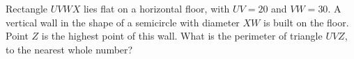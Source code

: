 Rectangle $UVWX$ lies flat on a horizontal floor, with $UV=20$ and $VW=30$. A vertical wall in the shape of a semicircle with diameter $XW$ is built on the floor. Point $Z$ is the highest point of this wall. What is the perimeter of triangle $UVZ$, to the nearest whole number?
